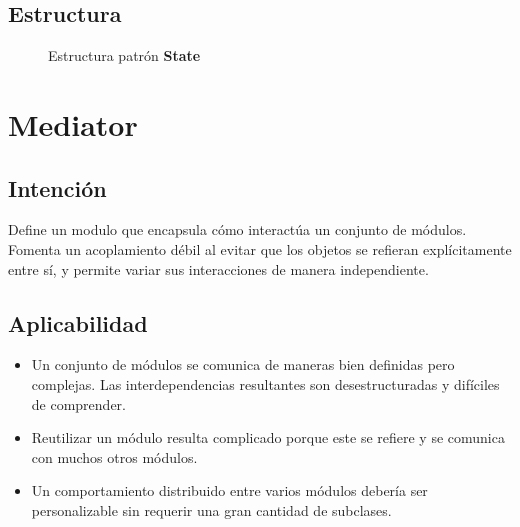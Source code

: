 \subsection*{Estructura}

\begin{figure}[h]
\caption{Estructura patrón \textbf{State}}
\begin{center}
\end{center}
\end{figure}

\section{Mediator}

\subsection*{Intención}
Define un modulo que encapsula cómo interactúa un conjunto de módulos. Fomenta un acoplamiento débil al evitar que los objetos se refieran explícitamente entre sí, y permite variar sus interacciones de manera independiente.

\subsection*{Aplicabilidad}
\begin{itemize}
\item Un conjunto de módulos se comunica de maneras bien definidas pero complejas. Las interdependencias resultantes son desestructuradas y difíciles de comprender.

\item Reutilizar un módulo resulta complicado porque este se refiere y se comunica con muchos otros módulos.

\item Un comportamiento distribuido entre varios módulos debería ser personalizable sin requerir una gran cantidad de subclases.
\end{itemize}

